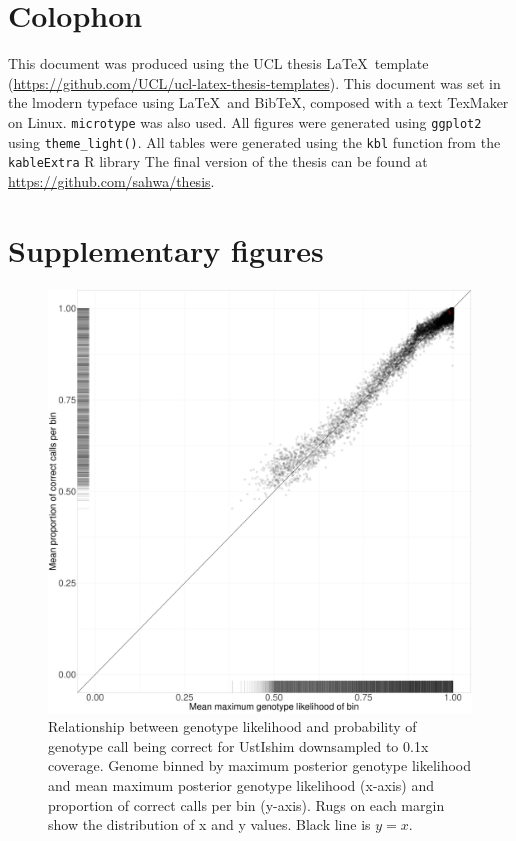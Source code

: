 \chapter{Colophon}
\label{appendixlabel3}
\noindent
This document was produced using the UCL thesis \LaTeX\ template (\url{https://github.com/UCL/ucl-latex-thesis-templates}).
\noindent
This document was set in the lmodern typeface using \LaTeX\ and Bib\TeX, composed with a text TexMaker on Linux. \texttt{microtype} was also used.
\noindent
All figures were generated using \texttt{ggplot2} using \texttt{theme\_light()}.
\noindent
All tables were generated using the \texttt{kbl} function from the \texttt{kableExtra} R library
\noindent
The final version of the thesis can be found at \url{https://github.com/sahwa/thesis}.

\chapter{Supplementary figures}
\label{appendixlabel4}

\begin{figure}[htp]
    \centering
    \includegraphics[width=1.0\textwidth]{../images/appendix/UstIshim_0.1x_bin.pdf}
    \caption{Relationship between genotype likelihood and probability of genotype call being correct for UstIshim downsampled to 0.1x coverage. Genome binned by maximum posterior genotype likelihood and mean maximum posterior genotype likelihood (x-axis) and proportion of correct calls per bin (y-axis). Rugs on each margin show the distribution of x and y values. Black line is $y=x$.}
    \label{fig:UstIshim_0.1x_bin}
\end{figure}

